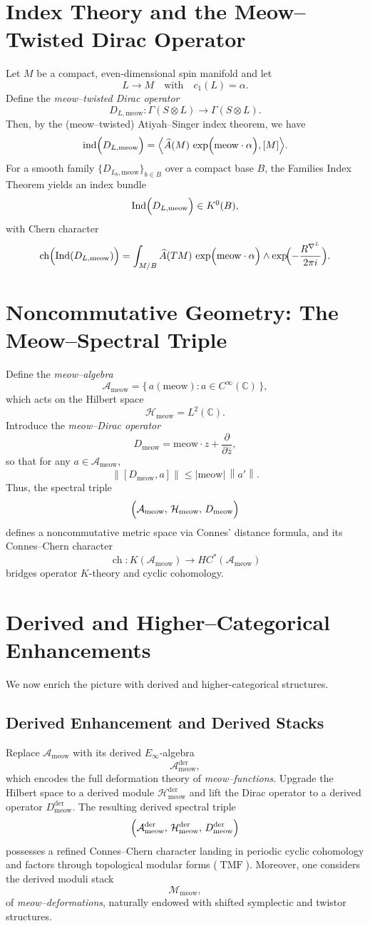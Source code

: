 \documentclass[11pt,a4paper]{article}
\newcommand{\meow}{\mathrm{meow}}
\newcommand{\Mmeow}{\mathcal{M}_{\meow}}
\newcommand{\Ameow}{\mathcal{A}_{\meow}}
\newcommand{\Hmeow}{\mathcal{H}_{\meow}}
\newcommand{\ind}{\operatorname{ind}}
\newcommand{\ch}{\operatorname{ch}}
\newcommand{\TMF}{\operatorname{TMF}}
\newcommand{\norm}[1]{\left\|#1\right\|}
\theoremstyle{plain}
\theoremstyle{definition}
\theoremstyle{remark}
\begin{document}
\section{Index Theory and the Meow--Twisted Dirac Operator}
Let \(M\) be a compact, even-dimensional spin manifold and let
\[
    L \to M \quad \text{with} \quad c_1(L)=\alpha.
\]
Define the \emph{meow--twisted Dirac operator}
\[
    D_{L,\meow}\colon \Gamma(S\otimes L) \to \Gamma(S\otimes L).
\]
Then, by the (meow--twisted) Atiyah--Singer index theorem, we have
\[
    \ind\Bigl(D_{L,\meow}\Bigr)
    = \Bigl\langle \widehat{A}(M)\,\exp\Bigl(\meow\cdot\alpha\Bigr),[M]\Bigr\rangle.
\]
For a smooth family \(\{D_{L_b,\meow}\}_{b\in B}\) over a compact base \(B\), the Families Index Theorem yields an index bundle
\[
    \operatorname{Ind}\Bigl(D_{L,\meow}\Bigr)\in K^0(B),
\]
with Chern character
\[
    \ch\Bigl(\operatorname{Ind}(D_{L,\meow})\Bigr)
    = \int_{M/B}\widehat{A}(TM)\,\exp\Bigl(\meow\cdot\alpha\Bigr)
    \wedge \exp\!\Bigl(-\frac{R^{\nabla^L}}{2\pi i}\Bigr).
\]

\section{Noncommutative Geometry: The Meow--Spectral Triple}
Define the \emph{meow--algebra}
\[
    \Ameow = \{\,a(\meow) : a\in C^\infty(\mathbb{C})\,\},
\]
which acts on the Hilbert space
\[
    \Hmeow = L^2(\mathbb{C}).
\]
Introduce the \emph{meow--Dirac operator}
\[
    D_{\meow} = \meow \cdot z + \frac{\partial}{\partial \bar{z}},
\]
so that for any \(a\in\Ameow\),
\[
    \norm{[D_{\meow},a]} \le |\meow| \, \norm{a'}.
\]
Thus, the spectral triple
\[
    \Bigl(\Ameow,\, \Hmeow,\, D_{\meow}\Bigr)
\]
defines a noncommutative metric space via Connes’ distance formula, and its Connes--Chern character
\[
    \ch\colon K(\Ameow) \to HC^*(\Ameow)
\]
bridges operator \(K\)-theory and cyclic cohomology.

\section{Derived and Higher--Categorical Enhancements}
We now enrich the picture with derived and higher-categorical structures.

\subsection{Derived Enhancement and Derived Stacks}
Replace \(\Ameow\) with its derived \(E_\infty\)-algebra
\[
    \Ameow^{\mathrm{der}},
\]
which encodes the full deformation theory of \emph{meow--functions}. Upgrade the Hilbert space to a derived module \(\Hmeow^{\mathrm{der}}\) and lift the Dirac operator to a derived operator \(D_{\meow}^{\mathrm{der}}\). The resulting derived spectral triple
\[
    \Bigl(\Ameow^{\mathrm{der}},\, \Hmeow^{\mathrm{der}},\, D_{\meow}^{\mathrm{der}}\Bigr)
\]
possesses a refined Connes--Chern character landing in periodic cyclic cohomology and factors through topological modular forms (\(\TMF\)). Moreover, one considers the derived moduli stack
\[
    \Mmeow,
\]
of \emph{meow--deformations}, naturally endowed with shifted symplectic and twistor structures.
\end{document}
